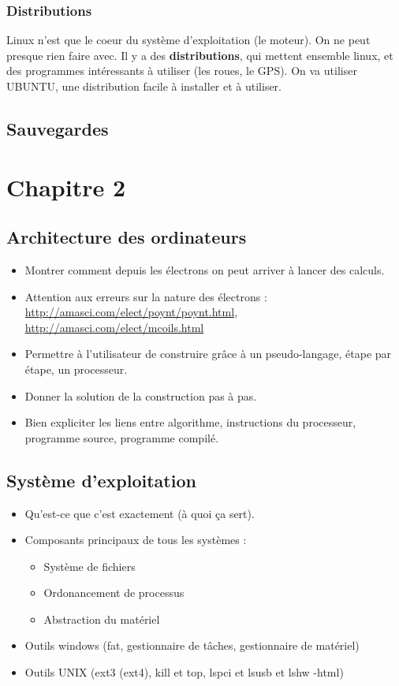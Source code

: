 \documentclass{book}
\def\keyword{\textbf}
\begin{document}
\subsection{Distributions}
Linux n'est que le coeur du système d'exploitation (le moteur). On ne peut presque rien faire avec. Il y a des \keyword{distributions}, qui mettent ensemble linux, et des programmes intéressants à utiliser (les roues, le GPS). On va utiliser UBUNTU, une distribution facile à installer et à utiliser.

\section{Sauvegardes}

\chapter{Chapitre 2}

\section{Architecture des ordinateurs}
\begin{itemize}
\item Montrer comment depuis les électrons on peut arriver à lancer des calculs.
\item Attention aux erreurs sur la nature des électrons : \url{http://amasci.com/elect/poynt/poynt.html}, \url{http://amasci.com/elect/mcoils.html}
\item Permettre à l'utilisateur de construire grâce à un pseudo-langage, étape par étape, un processeur.
\item Donner la solution de la construction pas à pas.
\item Bien expliciter les liens entre algorithme, instructions du processeur, programme source, programme compilé.
\end{itemize}


\section{Système d'exploitation}
\label{sec:Système d'exploitation}

\begin{itemize}
\item Qu'est-ce que c'est exactement (à quoi ça sert).
\item Composants principaux de tous les systèmes :
  \begin{itemize}
  \item Système de fichiers
  \item Ordonancement de processus
  \item Abstraction du matériel
  \end{itemize}
\item Outils windows (fat, gestionnaire de tâches, gestionnaire de matériel)
\item Outils UNIX (ext3 (ext4), kill et top, lspci et lsusb et lshw -html)
\end{itemize}
\end{document}
